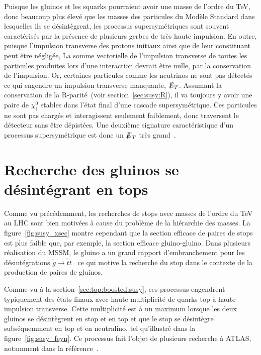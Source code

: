 Puisque les gluinos et les squarks pourraient avoir une masse de
l'ordre du TeV, donc beaucoup plus élevé que les masses des particules
du Modèle Standard dans lesquelles ils se désintègrent, les processus
supersymétriques sont souvent caractérisés par la présence de
plusieurs gerbes de très haute impulsion. En outre, puisque
l'impulsion transverse des protons initiaux ainsi que de leur
constituant peut être négligée, La somme vectorielle de l'impulsion
transverse de toutes les particules produites lors d'une interaction
devrait être nulle, par la conservation de l'impulsion. Or, certaines
particules comme les neutrinos ne sont pas détectés ce qui engendre un
impulsion transverse manquante, $\slashed{E}_T$. Assumant la
conservation de la R-parité~(voir section~\ref{sec:susy:R}), il va toujours y avoir une paire de
$\chi_1^0$ stables dans l'état final d'une cascade
supersymétrique. Ces particules ne sont pas chargés et interagissent
seulement faiblement, donc traversent le détecteur sans être
dépistées. Une deuxième signature caractéristique d'un processus
supersymétrique est donc un $\slashed{E}_T$ très
grand~\cite{olive_susy2_2014}.


\section{Recherche des gluinos se désintégrant en tops}
\label{sec:susy_atlas:gtt}

Comme vu précédemment, les recherches de stops avec masses de l'ordre
du TeV au LHC sont bien motivées à cause du problème de la hiérarchie
des masses. La figure~\ref{fig:susy_xsec} montre cependant que la
section efficace de paires de stops est plus faible que, par exemple,
la section efficace gluino-gluino. Dans plusieurs réalisation du
MSSM, le gluino a un grand rapport d'embranchement pour les
désintégrations
$\tilde{g} \rightarrow \tilde{t} t$~\cite{bandyopadhyay_boosted_2011}
ce qui motive la recherche du stop dans le contexte de la production
de paires de gluinos. 

Comme vu à la section~\ref{sec:top:boosted:susy}, ces processus
engendrent typiquement des états finaux avec haute multiplicité de
quarks top à haute impulsion transverse. Cette multiplicité est à un
maximum lorsque les deux gluinos se désintègrent en stop et en top et
que le stop se désintègre subséquemment en top et en neutralino, tel
qu'illustré dans la figure~\ref{fig:susy_feyn}. Ce processus fait l'objet
de plusieurs recherche à ATLAS, notamment dans la référence~\cite{ATLAS-CONF-2015-067}.

